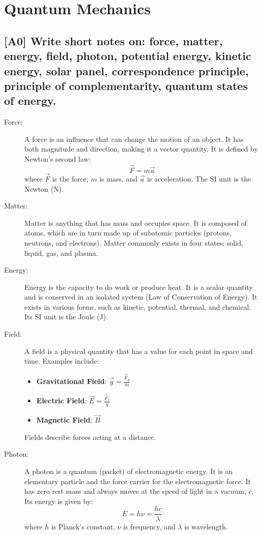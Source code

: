 \documentclass[12pt]{article}
\begin{document}
\setcounter{secnumdepth}{-1}
\tableofcontents
\newpage

\section*{Quantum Mechanics}

\subsection{[A0] Write short notes on: force, matter, energy, field, photon, potential energy, kinetic energy, solar panel, correspondence principle, principle of complementarity, quantum states of energy.}

\begin{description}

\item[Force:]
A force is an influence that can change the motion of an object. It has both magnitude and direction, making it a vector quantity. It is defined by Newton's second law:
\[
\vec{F} = m\vec{a}
\]
where \( \vec{F} \) is the force, \( m \) is mass, and \( \vec{a} \) is acceleration. The SI unit is the Newton (N).

\item[Matter:]
Matter is anything that has mass and occupies space. It is composed of atoms, which are in turn made up of subatomic particles (protons, neutrons, and electrons). Matter commonly exists in four states: solid, liquid, gas, and plasma.

\item[Energy:]
Energy is the capacity to do work or produce heat. It is a scalar quantity and is conserved in an isolated system (Law of Conservation of Energy). It exists in various forms, such as kinetic, potential, thermal, and chemical. Its SI unit is the Joule (J).

\item[Field:]
A field is a physical quantity that has a value for each point in space and time. Examples include:
\begin{itemize}
    \item \textbf{Gravitational Field}: \( \vec{g} = \frac{\vec{F}_g}{m} \)
    \item \textbf{Electric Field}: \( \vec{E} = \frac{\vec{F}_e}{q} \)
    \item \textbf{Magnetic Field}: \( \vec{B} \)
\end{itemize}
Fields describe forces acting at a distance.

\item[Photon:]
A photon is a quantum (packet) of electromagnetic energy. It is an elementary particle and the force carrier for the electromagnetic force. It has zero rest mass and always moves at the speed of light in a vacuum, \( c \). Its energy is given by:
\[
E = h\nu = \frac{hc}{\lambda}
\]
where \( h \) is Planck's constant, \( \nu \) is frequency, and \( \lambda \) is wavelength.


\end{description}
\end{document}
